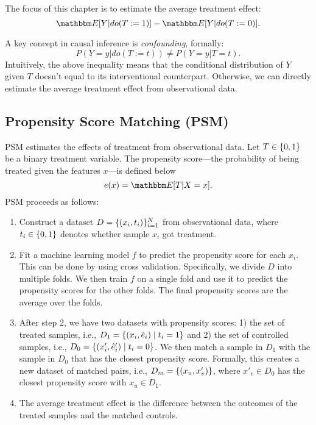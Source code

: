 

The focus of this chapter is to estimate the average treatment effect:
    \begin{equation}
        \E[Y | do( T:= 1)] - \E[Y | do( T:= 0)].
    \end{equation}

A key concept in causal inference is \emph{confounding}, formally:
    \begin{equation}
        P(Y=y | do(T:=t)) \ne P(Y=y | T=t).
    \end{equation}
Intuitively, the above inequality means that the conditional distribution of $Y$ given $T$ doesn't equal to its interventional counterpart. Otherwise, we can directly estimate the average treatment effect from observational data.

\subsection{Propensity Score Matching (PSM)}
    PSM estimates the effects of treatment from observational data.
    Let $T \in \{ 0, 1 \}$ be a binary treatment variable.
    The propensity score---the probability of being treated given the features $x$---is defined below
        \begin{equation}
            e(x) = \E[T | X = x].
        \end{equation}
    PSM proceeds as follows:
        \begin{enumerate}
            \item Construct a dataset $D = \{ (x_i, t_i) \}_{i=1}^{N}$ from observational data, where $t_i \in \{ 0, 1 \}$ denotes whether sample $x_i$ got treatment.
            \item Fit a machine learning model $f$ to predict the propensity score for each $x_i$. This can be done by using cross validation. Specifically, we divide $D$ into multiple folds. We then train $f$ on a single fold and use it to predict the propensity scores for the other folds. 
            The final propensity scores are the average over the folds. 
            
            \item After step 2, we have two datasets with propensity scores: 1) the set of treated samples, i.e., $D_1 = \{ (x_i, \hat{e}_i) \mid t_i=1 \}$ and 2) the set of controlled samples, i.e., $D_0 = \{ (x'_i, \hat{e}'_i) \mid t_i=0 \}$.
            We then match a sample in $D_1$ with the sample in $D_0$ that has the closest propensity score.
            Formally, this creates a new dataset of matched pairs, i.e., $D_m = \{ (x_u, x'_v) \}$, where $x'_v \in D_0$ has the closest propensity score with $x_u \in D_1$.
            
            \item The average treatment effect is the difference between the outcomes of the treated samples and the matched controls.
        \end{enumerate}
        

